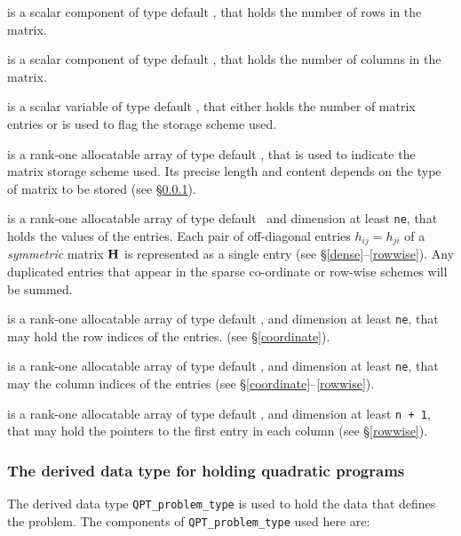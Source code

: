 \documentclass{galahad}
\begin{document}
\begin{description}

 is a scalar component of type default \integer, 
that holds the number of rows in the matrix. 
 
 is a scalar component of type default \integer, 
that holds the number of columns in the matrix. 
 
 is a scalar variable of type default \integer, that either 
holds the number of matrix entries or is used to flag the storage scheme
used. 

 is a rank-one allocatable array of type default \character, that
is used to indicate the matrix storage scheme used. Its precise length and
content depends on the type of matrix to be stored (see \S\ref{typeqp}).

 is a rank-one allocatable array of type default \realdp\, 
and dimension at least {\tt ne}, that holds the values of the entries. 
Each pair of off-diagonal entries $h_{ij} = h_{ji}$ of a {\em symmetric}
matrix ${\mathbf{H}}$ is represented as a single entry 
(see \S\ref{dense}--\ref{rowwise}).
Any duplicated entries that appear in the sparse 
co-ordinate or row-wise schemes will be summed. 

 is a rank-one allocatable array of type default \integer, 
and dimension at least {\tt ne}, that may hold the row indices of the entries. 
(see \S\ref{coordinate}).

 is a rank-one allocatable array of type default \integer, 
and dimension at least {\tt ne}, that may the column indices of the entries
(see \S\ref{coordinate}--\ref{rowwise}).

 is a rank-one allocatable array of type default \integer, 
and dimension at least {\tt n + 1}, that may hold the pointers to
the first entry in each column (see \S\ref{rowwise}).

\end{description}


\subsubsection{The derived data type for holding quadratic programs}
\label{typeqp}

The derived data type 
{\tt QPT\_problem\_type}
is used to hold the data that defines the problem.
The components of 
{\tt QPT\_problem\_type} used here are:
\end{document}
